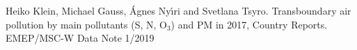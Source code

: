 
 \enlargethispage{\baselineskip}
 \begin{list}{}{\setlength{\leftmargin}{15pt}\setlength{\itemindent}{-\leftmargin}}\small

 \item[]
 Heiko Klein, Michael Gauss, \'Agnes  Ny\'{\i}ri  and Svetlana Tsyro. 
Transboundary air pollution by main pollutants (S, N, O$_{3}$) and
 PM in 2017, Country Reports. EMEP/MSC-W Data Note 1/2019


 \end{list}







\newpage
\renewcommand\bibname{References}      %

